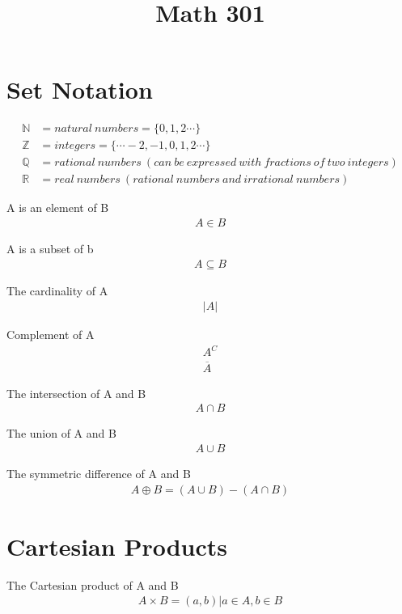 \documentclass{article}
\title{Math 301}
\begin{document}
\section{Set Notation}
\begin{align*}
    \mathbb{N} &= natural\ numbers = \{0, 1, 2 \cdots\} \\
    \mathbb{Z} &= integers = \{ \cdots -2, -1, 0, 1, 2 \cdots \}\\
    \mathbb{Q} &= rational\ numbers\ (can\ be\ expressed\ with\ fractions\ of\ two\ integers) \\
    \mathbb{R} &= real\ numbers\ (rational\ numbers\ and\ irrational\ numbers)
\end{align*}

A is an element of B
\begin{gather*}
    A \in B
\end{gather*}

A is a subset of b
\begin{gather*}
    A \subseteq B
\end{gather*}

The cardinality of A
\begin{gather*}
    |A|
\end{gather*}

Complement of A
\begin{gather*}
    A^C \\
    \overline{A}
\end{gather*}

The intersection of A and B
\begin{gather*}
    A \cap B
\end{gather*}

The union of A and B
\begin{gather*}
    A \cup B
\end{gather*}

The symmetric difference of A and B
\begin{gather*}
    A \oplus B = (A \cup B) - (A \cap B)
\end{gather*}

\section{Cartesian Products}

The Cartesian product of A and B
\begin{gather*}
    A \times B = {(a, b) | a \in A, b \in B}
\end{gather*}
\end{document}
